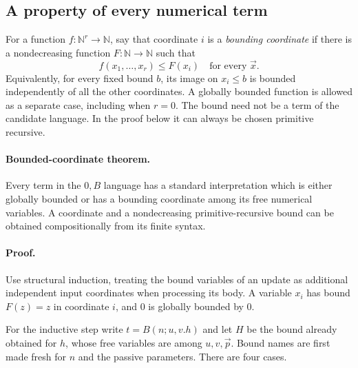 \subsection{A property of every numerical term}

For a function $f:\mathbb N^r\to\mathbb N$, say that coordinate $i$ is
a \emph{bounding coordinate} if there is a nondecreasing function
$F:\mathbb N\to\mathbb N$ such that
\[
             f(x_1,\ldots,x_r)\le F(x_i)
             \quad\text{for every }\vec x.
 \tag{BC}\label{eq:bounding-coordinate}
\]
Equivalently, for every fixed bound $b$, its image on $x_i\le b$ is
bounded independently of all the other coordinates.  A globally bounded
function is allowed as a separate case, including when $r=0$.
The bound need not be a term of the candidate language.  In the proof
below it can always be chosen primitive recursive.

\paragraph{Bounded-coordinate theorem.}
Every term in the $0,B$ language has a standard interpretation which is
either globally bounded or has a bounding coordinate among its free
numerical variables.  A coordinate and a nondecreasing primitive-recursive
bound can be obtained compositionally from its finite syntax.

\paragraph{Proof.}
Use structural induction, treating the bound variables of an update as
additional independent input coordinates when processing its body.
A variable $x_i$ has bound $F(z)=z$ in coordinate $i$, and $0$ is
globally bounded by $0$.

For the inductive step write $t=B(n;u,v.h)$ and let $H$ be the bound
already obtained for $h$, whose free variables are among
$u,v,\vec p$.  Bound names are first made fresh for $n$ and the passive
parameters.  There are four cases.

